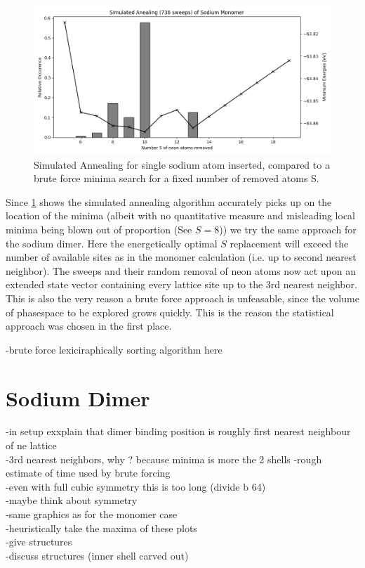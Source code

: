 \begin{figure}[h!]
	\centering
	\includegraphics[scale=0.5]{./Inhalt/Bilder/optimal_defect_simulated_annealing.png}
	\caption{Simulated Annealing for single sodium atom inserted, compared to a brute force minima search for a fixed number of removed atoms S.}
	\label{fig:simulatedannealingsodium}
\end{figure}  

Since \ref{fig:simulatedannealingsodium} shows the simulated annealing algorithm accurately picks up on the location of the minima (albeit with no quantitative measure and misleading local minima being blown out of proportion (See $S=8$)) we try the same approach for the sodium dimer. Here the energetically optimal $S$ replacement will exceed the number of available sites as in the monomer calculation (i.e. up to second nearest neighbor). The sweeps and their random removal of neon atoms now act upon an extended state vector containing every lattice site up to the 3rd nearest neighbor. This is also the very reason a brute force approach is unfeasable, since the volume of phasespace to be explored grows quickly. This is the reason the statistical approach was chosen in the first place. 


-brute force lexiciraphically sorting algorithm here

\section{Sodium Dimer}
-in setup exxplain that dimer binding position is roughly first nearest neighbour of  ne lattice\\
-3rd nearest neighbors, why ? because minima is more the 2 shells
-rough estimate of time used by brute forcing\\
-even with full cubic symmetry this is too long (divide b 64)\\
-maybe think about symmetry\\
-same graphics as for the monomer case\\
-heuristically take the maxima of these plots \\
-give structures\\
-discuss structures (inner shell carved out)\\

